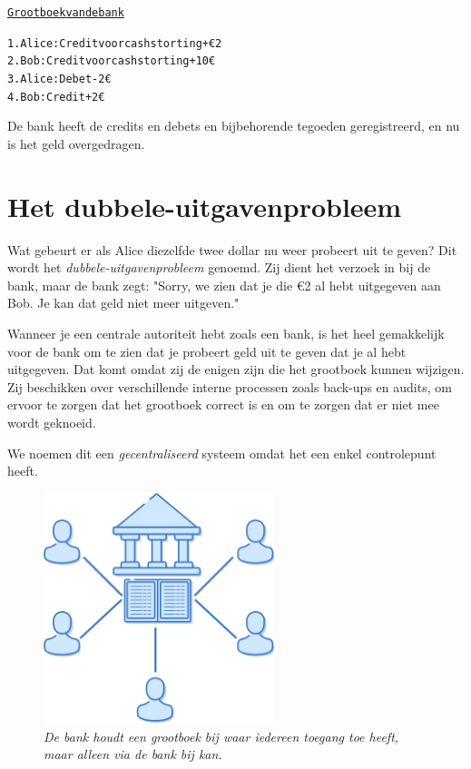 \begin{alltt}
\underline{Grootboek van de bank}

    1. Alice: Credit voor cash storting +€2
    2. Bob: Credit voor cash storting +10€
    3. Alice: Debet -2€
    4. Bob: Credit +2€
\end{alltt}

De bank heeft de credits en debets en bijbehorende tegoeden geregistreerd, en nu is het geld overgedragen.

\section{Het dubbele-uitgavenprobleem}

Wat gebeurt er als Alice diezelfde twee dollar nu weer probeert uit te geven? Dit wordt het \textit{dubbele-uitgavenprobleem} genoemd. Zij dient het verzoek in bij de bank, maar de bank zegt: "Sorry, we zien dat je die €2 al hebt uitgegeven aan Bob. Je kan dat geld niet meer uitgeven."

Wanneer je een centrale autoriteit hebt zoals een bank, is het heel gemakkelijk voor de bank om te zien dat je probeert geld uit te geven dat je al hebt uitgegeven. Dat komt omdat zij de enigen zijn die het grootboek kunnen wijzigen. Zij beschikken over verschillende interne processen zoals back-ups en audits, om ervoor te zorgen dat het grootboek correct is en om te zorgen dat er niet mee wordt geknoeid.

We noemen dit een \textit{gecentraliseerd} systeem omdat het een enkel controlepunt heeft.

\begin{figure}
    \centering
    \includegraphics[width=0.6\textwidth]{images/fig2.png}
    \caption{\footnotesize{\textit{De bank houdt een grootboek bij waar iedereen toegang toe heeft, maar alleen via de bank bij kan.}}}
    \label{fig2}
\end{figure}

